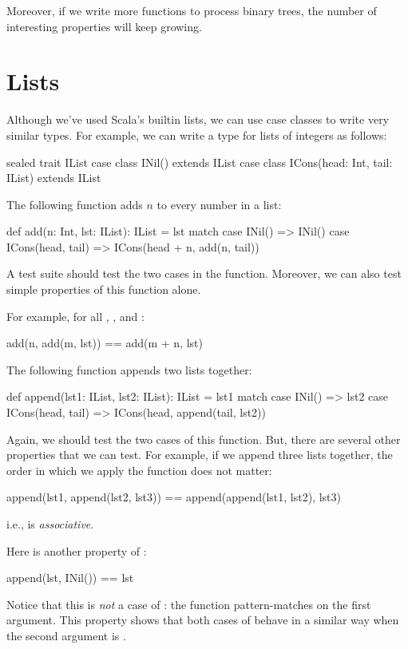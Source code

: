 \documentclass{book}
\begin{document}
Moreover, if we write more functions to process binary trees, the number of
interesting properties will keep growing.

\section{Lists}

Although we've used Scala's builtin lists, we can use case classes to write
very similar types. For example, we can write a type for lists of integers
as follows:
%
\begin{scalacode}
sealed trait IList
case class INil() extends IList
case class ICons(head: Int, tail: IList) extends IList
\end{scalacode}

The following function adds $n$ to every number in a list:
%
\begin{scalacode}
def add(n: Int, lst: IList): IList = lst match {
  case INil() => INil()
  case ICons(head, tail) => ICons(head + n, add(n, tail))
}
\end{scalacode}

A test suite should test the two cases in the function. Moreover, we can
also test simple properties of this function alone.

For example, for all , , and :
%
\begin{scalacode}
add(n, add(m, lst)) == add(m + n, lst)
\end{scalacode}

The following function appends two lists together:
%
\begin{scalacode}
def append(lst1: IList, lst2: IList): IList = lst1 match {
  case INil() => lst2
  case ICons(head, tail) => ICons(head, append(tail, lst2))
}
\end{scalacode}

Again, we should test the two cases of this function. But, there are
several other properties that we can test. For example, if we append
three lists together, the order in which we apply the function
does not matter:
%
\begin{scalacode}
append(lst1, append(lst2, lst3)) == append(append(lst1, lst2), lst3)
\end{scalacode}
i.e.,  is \emph{associative}.

Here is another property of :
\begin{scalacode}
append(lst, INil()) == lst
\end{scalacode}
%
Notice that this is \emph{not} a case of : the function
pattern-matches on the first argument. This property shows that both cases
of  behave in a similar way when the second argument is
.
\end{document}
